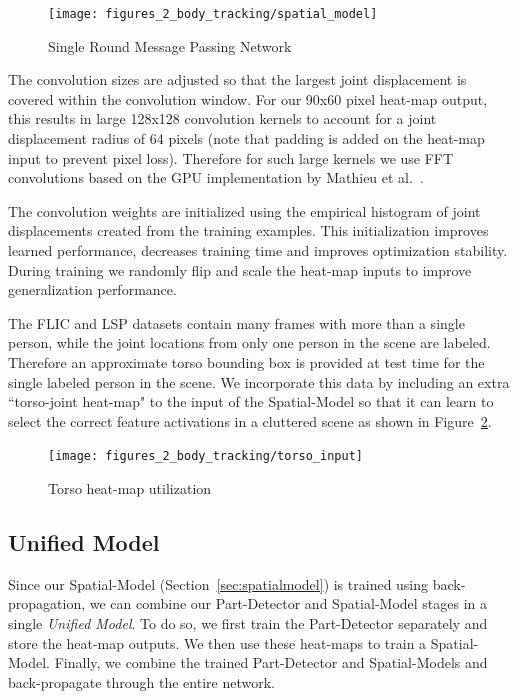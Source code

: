 \begin{figure}[th]
  \centering
    \texttt{[image: figures\_2\_body\_tracking/spatial\_model]}
    \caption{Single Round Message Passing Network}
  \label{fig:spatial_model_network}
\end{figure}

The convolution sizes are adjusted so that the largest joint displacement is covered within the convolution window. For our 90x60 pixel heat-map output, this results in large 128x128 convolution kernels to account for a joint displacement radius of 64 pixels (note that padding is added on the heat-map input to prevent pixel loss). Therefore for such large kernels we use FFT convolutions based on the GPU implementation by Mathieu et al.~\cite{fft}.

The convolution weights are initialized using the empirical histogram of joint displacements created from the training examples. This initialization improves learned performance, decreases training time and improves optimization stability. During training we randomly flip and scale the heat-map inputs to improve generalization performance.

The FLIC and LSP datasets contain many frames with more than a single person, while the joint locations from only one person in the scene are labeled. Therefore an approximate torso bounding box is provided at test time for the single labeled person in the scene. We incorporate this data by including an extra ``torso-joint heat-map" to the input of the Spatial-Model so that it can learn to select the correct feature activations in a cluttered scene as shown in Figure~\ref{fig:torso_input}.

\begin{figure}[th]
  \centering
    \texttt{[image: figures\_2\_body\_tracking/torso\_input]}
    \caption{Torso heat-map utilization}
  \label{fig:torso_input}
\end{figure}

\subsection{Unified Model}
\label{sec:unified}

Since our Spatial-Model (Section~\ref{sec:spatialmodel}) is trained using back-propagation, we can combine our Part-Detector and Spatial-Model stages in a single \emph{Unified Model}. To do so, we first train the Part-Detector separately and store the heat-map outputs. We then use these heat-maps to train a Spatial-Model. Finally, we combine the trained Part-Detector and Spatial-Models and back-propagate through the entire network.

